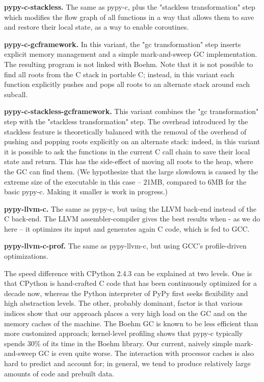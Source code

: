 \documentclass{acm_proc_article-sp}
\begin{document}
{\bf pypy-c-stackless.}
    The same as pypy-c, plus the "stackless transformation" step which
    modifies the flow graph of all functions in a way that allows them
    to save and restore their local state, as a way to enable coroutines.

{\bf pypy-c-gcframework.}
    In this variant, the "gc transformation" step inserts explicit
    memory management and a simple mark-and-sweep GC implementation.
    The resulting program is not linked with Boehm.  Note that it is not
    possible to find all roots from the C stack in portable C; instead,
    in this variant each function explicitly pushes and pops all roots
    to an alternate stack around each subcall.

{\bf pypy-c-stackless-gcframework.}
    This variant combines the "gc transformation" step with the
    "stackless transformation" step.  The overhead introduced by the
    stackless feature is theoretically balanced with the removal of the
    overhead of pushing and popping roots explicitly on an alternate
    stack: indeed, in this variant it is possible to ask the functions
    in the current C call chain to save their local state and return.
    This has the side-effect of moving all roots to the heap, where the
    GC can find them.  (We hypothesize that the large slowdown is caused
    by the extreme size of the executable in this case -- 21MB, compared to
    6MB for the basic pypy-c.  Making it smaller is work in progress.)

{\bf pypy-llvm-c.}
    The same as pypy-c, but using the LLVM back-end instead of the C
    back-end.  The LLVM assembler-compiler gives the best results when -
    as we do here -- it optimizes its input and generates again C code,
    which is fed to GCC.

{\bf pypy-llvm-c-prof.}
    The same as pypy-llvm-c, but using GCC's profile-driven
    optimizations.

The speed difference with CPython 2.4.3 can be explained at two levels.
One is that CPython is hand-crafted C code that has been continuously
optimized for a decade now, whereas the Python interpreter of PyPy first
seeks flexibility and high abstraction levels.  The other, probably
dominant, factor is that various indices show that our approach places a
very high load on the GC and on the memory caches of the machine.  The
Boehm GC is known to be less efficient than more customized approach;
kernel-level profiling shows that pypy-c typically spends 30\% of its
time in the Boehm library.  Our current, naively simple mark-and-sweep
GC is even quite worse.  The interaction with processor caches is also
hard to predict and account for; in general, we tend to produce
relatively large amounts of code and prebuilt data.
\end{document}
